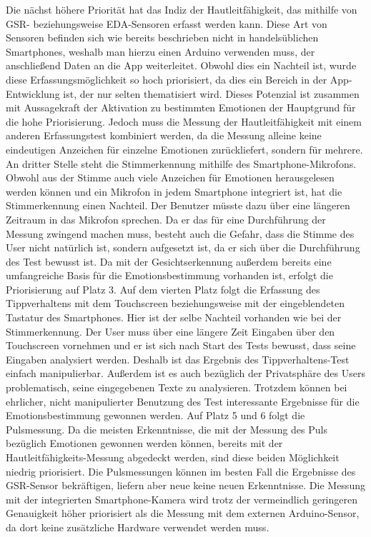 \newline
Die nächst höhere Priorität hat das Indiz der Hautleitfähigkeit, das mithilfe von GSR- beziehungsweise EDA-Sensoren erfasst werden kann. Diese Art von Sensoren befinden sich wie bereits beschrieben nicht in handelsüblichen Smartphones, weshalb man hierzu einen Arduino verwenden muss, der anschließend Daten an die App weiterleitet. Obwohl dies ein Nachteil ist, wurde diese Erfassungsmöglichkeit so hoch priorisiert, da dies ein Bereich in der App-Entwicklung ist, der nur selten thematisiert wird. Dieses Potenzial ist zusammen mit Aussagekraft der Aktivation zu bestimmten Emotionen der Hauptgrund für die hohe Priorisierung. Jedoch muss die Messung der Hautleitfähigkeit mit einem anderen Erfassungstest kombiniert werden, da die Messung alleine keine eindeutigen Anzeichen für einzelne Emotionen zurückliefert, sondern für mehrere.\newline
An dritter Stelle steht die Stimmerkennung mithilfe des Smartphone-Mikrofons. Obwohl aus der Stimme auch viele Anzeichen für Emotionen herausgelesen werden können und ein Mikrofon in jedem Smartphone integriert ist, hat die Stimmerkennung einen Nachteil. Der Benutzer müsste dazu über eine längeren Zeitraum in das Mikrofon sprechen. Da er das für eine Durchführung der Messung zwingend machen muss, besteht auch die Gefahr, dass die Stimme des User nicht natürlich ist, sondern aufgesetzt ist, da er sich über die Durchführung des Test bewusst ist. Da mit der Gesichtserkennung außerdem bereits eine umfangreiche Basis für die Emotionsbestimmung vorhanden ist, erfolgt die Priorisierung auf Platz 3. \newline
Auf dem vierten Platz folgt die Erfassung des Tippverhaltens mit dem Touchscreen beziehungsweise mit der eingeblendeten Tastatur des Smartphones. Hier ist der selbe Nachteil vorhanden wie bei der Stimmerkennung. Der User muss über eine längere Zeit Eingaben über den Touchscreen vornehmen und er ist sich nach Start des Tests bewusst, dass seine Eingaben analysiert werden. Deshalb ist das Ergebnis des Tippverhaltens-Test einfach manipulierbar. Außerdem ist es auch bezüglich der Privatsphäre des Users problematisch, seine eingegebenen Texte zu analysieren. Trotzdem können bei ehrlicher, nicht manipulierter Benutzung des Test interessante Ergebnisse für die Emotionsbestimmung gewonnen werden. \newline
Auf Platz 5 und 6 folgt die Pulsmessung. Da die meisten Erkenntnisse, die mit der Messung des Puls bezüglich Emotionen gewonnen werden können, bereits mit der Hautleitfähigkeits-Messung abgedeckt werden, sind diese beiden Möglichkeit niedrig priorisiert. Die Pulsmessungen können im besten Fall die Ergebnisse des GSR-Sensor bekräftigen, liefern aber neue keine neuen Erkenntnisse. Die Messung mit der integrierten Smartphone-Kamera wird trotz der vermeindlich geringeren Genauigkeit höher priorisiert als die Messung mit dem externen Arduino-Sensor, da dort keine zusätzliche Hardware verwendet werden muss. \newline
